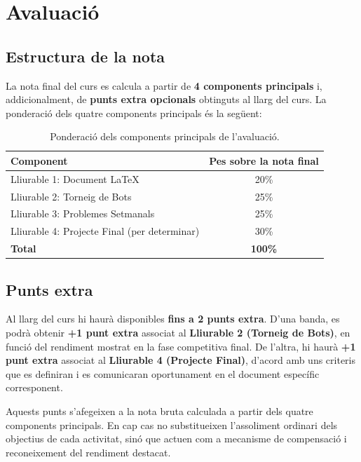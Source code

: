 \chapter{Avaluaci\'o}
\label{chap:avaluacio}

\section{Estructura de la nota}

La nota final del curs es calcula a partir de \textbf{4 components principals} i, addicionalment, de \textbf{punts extra opcionals} obtinguts al llarg del curs. La ponderaci\'o dels quatre components principals \'es la seg\"uent:

\begin{table}[h]
  \centering
  \begin{tabular}{p{10cm}c}
    \toprule
    \textbf{Component} & \textbf{Pes sobre la nota final} \\
    \midrule
    Lliurable 1: Document LaTeX & 20\% \\
    Lliurable 2: Torneig de Bots & 25\% \\
    Lliurable 3: Problemes Setmanals & 25\% \\
    Lliurable 4: Projecte Final (per determinar) & 30\% \\
    \midrule
    \textbf{Total} & \textbf{100\%} \\
    \bottomrule
  \end{tabular}
  \caption{Ponderaci\'o dels components principals de l'avaluaci\'o.}
  \label{tab:pesos}
\end{table}

\section{Punts extra}

Al llarg del curs hi haur\`a disponibles \textbf{fins a 2 punts extra}. D'una banda, es podr\`a obtenir \textbf{+1 punt extra} associat al \textbf{Lliurable 2 (Torneig de Bots)}, en funci\'o del rendiment mostrat en la fase competitiva final. De l'altra, hi haur\`a \textbf{+1 punt extra} associat al \textbf{Lliurable 4 (Projecte Final)}, d'acord amb uns criteris que es definiran i es comunicaran oportunament en el document espec\'ific corresponent.

Aquests punts s'afegeixen a la nota bruta calculada a partir dels quatre components principals. En cap cas no substitueixen l'assoliment ordinari dels objectius de cada activitat, sin\'o que actuen com a mecanisme de compensaci\'o i reconeixement del rendiment destacat.

